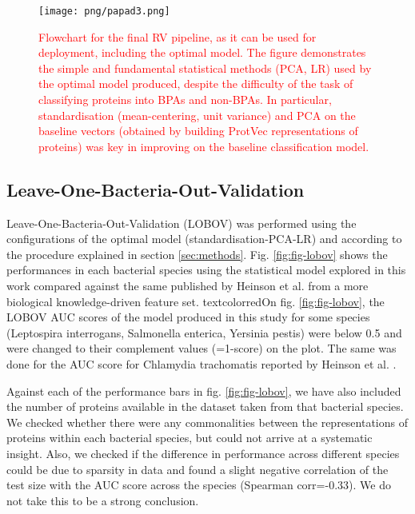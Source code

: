 \documentclass[10pt,journal,compsoc,twoside]{IEEEtran}
\begin{document}
\begin{figure}[!t]
\centering
\texttt{[image: png/papad3.png]}
\caption{\textcolor{red}{Flowchart for the final RV pipeline, as it can be used for deployment, including the optimal model. The figure demonstrates the simple and fundamental statistical methods (PCA, LR) used by the optimal model produced, despite the difficulty of the task of classifying proteins into BPAs and non-BPAs. In particular, standardisation (mean-centering, unit variance) and PCA on the baseline vectors (obtained by building ProtVec representations of proteins) was key in improving on the baseline classification model. } }
\label{fig:fig-pipeline-diagram}
\end{figure}



\subsection{Leave-One-Bacteria-Out-Validation}
\label{sec:lobov}

Leave-One-Bacteria-Out-Validation (LOBOV) was performed using the configurations of the optimal model (standardisation-PCA-LR) and according to the procedure explained in section \ref{sec:methods}. Fig. \ref{fig:fig-lobov} shows the performances in each bacterial species using the statistical model explored in this work compared against the same published by Heinson et al. \cite{heinson_2019} from a more biological knowledge-driven feature set. textcolor{red}{On fig. \ref{fig:fig-lobov}, the LOBOV AUC scores of the model produced in this study for some species (Leptospira interrogans, Salmonella enterica, Yersinia pestis) were below 0.5 and were changed to their complement values (=1-score) on the plot. The same was done for the AUC score for Chlamydia trachomatis reported by Heinson et al. \cite{heinson_2019}. }

Against each of the performance bars in fig. \ref{fig:fig-lobov}, we have also included the number of proteins available in the dataset taken from that bacterial species. We checked whether there were any commonalities between the representations of proteins within each bacterial species, but could not arrive at a systematic insight. Also, we checked if the difference in performance across different species could be due to sparsity in data and found a slight negative correlation of the test size with the AUC score across the species (Spearman corr=-0.33). We do not take this to be a strong conclusion.
\end{document}
